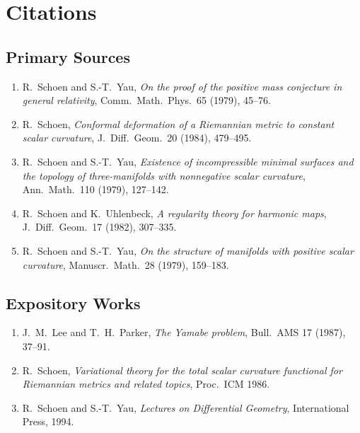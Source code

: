 \section{Citations}\subsection*{Primary Sources}
\begin{enumerate}
    \item R.\ Schoen and S.-T.\ Yau, \textit{On the proof of the positive mass conjecture in general relativity}, Comm.\ Math.\ Phys.\ 65 (1979), 45--76.
    \item R.\ Schoen, \textit{Conformal deformation of a Riemannian metric to constant scalar curvature}, J.\ Diff.\ Geom.\ 20 (1984), 479--495.
    \item R.\ Schoen and S.-T.\ Yau, \textit{Existence of incompressible minimal surfaces and the topology of three-manifolds with nonnegative scalar curvature}, Ann.\ Math.\ 110 (1979), 127--142.
    \item R.\ Schoen and K.\ Uhlenbeck, \textit{A regularity theory for harmonic maps}, J.\ Diff.\ Geom.\ 17 (1982), 307--335.
    \item R.\ Schoen and S.-T.\ Yau, \textit{On the structure of manifolds with positive scalar curvature}, Manuscr.\ Math.\ 28 (1979), 159--183.
\end{enumerate}

\subsection*{Expository Works}
\begin{enumerate}
    \item J.\ M.\ Lee and T.\ H.\ Parker, \textit{The Yamabe problem}, Bull.\ AMS 17 (1987), 37--91.
    \item R.\ Schoen, \textit{Variational theory for the total scalar curvature functional for Riemannian metrics and related topics}, Proc.\ ICM 1986.
    \item R.\ Schoen and S.-T.\ Yau, \textit{Lectures on Differential Geometry}, International Press, 1994.
\end{enumerate}

